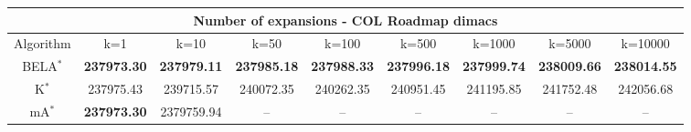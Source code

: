 \begin{tabular}{c|cccccccc}\toprule
\multicolumn{9}{c}{Number of expansions - COL Roadmap dimacs}\\ \midrule
Algorithm & k=1 & k=10 & k=50 & k=100 & k=500 & k=1000 & k=5000 & k=10000 \\ \midrule
BELA$^*$ & \textbf{237973.30} & \textbf{237979.11} & \textbf{237985.18} & \textbf{237988.33} & \textbf{237996.18} & \textbf{237999.74} & \textbf{238009.66} & \textbf{238014.55} \\
K$^*$ & 237975.43 & 239715.57 & 240072.35 & 240262.35 & 240951.45 & 241195.85 & 241752.48 & 242056.68 \\
mA$^*$ & \textbf{237973.30} & 2379759.94 & -- & -- & -- & -- & -- & -- \\ \bottomrule 
\end{tabular}

